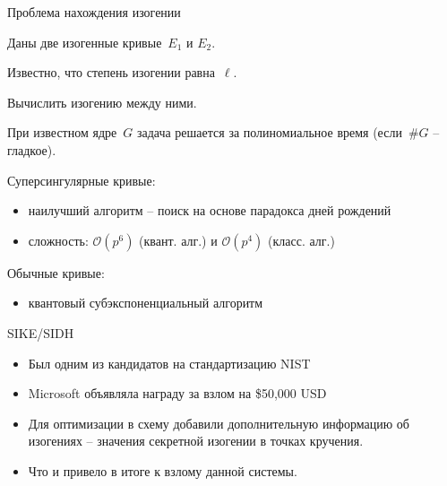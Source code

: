 \documentclass{beamer}
\begin{document}
\begin{frame}{Проблема нахождения изогении}
	\begin{center}
		\begin{tcolorbox}[enhanced,hbox,colback=title-and-section-color!5,colframe=title-and-section-color!120,title=Общая задача нахождения изогении,center title]
			\begin{varwidth}{\textwidth}
				\begin{center}
					Даны две изогенные кривые~$E_1$ и $E_2$. 
					
					Известно, что степень изогении равна~$\ell$. 
					
					Вычислить изогению между ними.
				\end{center}
			\end{varwidth}
		\end{tcolorbox}	
	\end{center}
При известном ядре~$G$ задача решается за полиномиальное время (если~$\#G$ -- гладкое).

\vspace{0.5em}
Суперсингулярные кривые:
\begin{itemize}
	\item наилучший алгоритм -- поиск на основе парадокса дней рождений
	\item сложность: $\mathcal{O}(p^6)$ (квант. алг.) и $\mathcal{O}(p^4)$ (класс. алг.)
\end{itemize}

\vspace{0.5em}
Обычные кривые: 
\begin{itemize}
	\item квантовый субэкспоненциальный алгоритм
\end{itemize}
\end{frame}

\begin{frame}{SIKE/SIDH}
	\begin{itemize}
		\item Был одним из кандидатов на стандартизацию NIST
		\item Microsoft объявляла награду за взлом на \$50,000 USD
		\item Для оптимизации в схему добавили дополнительную информацию об изогениях -- значения секретной изогении в точках кручения.
		\item Что и привело в итоге к взлому данной системы.
	\end{itemize}
\end{frame}
\end{document}
